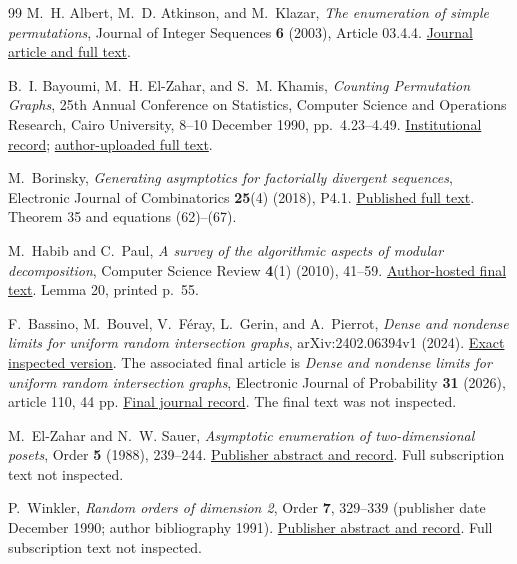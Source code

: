 \documentclass[11pt,letterpaper]{article}
\numberwithin{equation}{section}
\theoremstyle{definition}\newtheorem{definition}[theorem]{Definition}
\theoremstyle{remark}\newtheorem{remark}[theorem]{Remark}
\begin{document}
\begin{thebibliography}{99}
M.~H. Albert, M.~D. Atkinson, and M.~Klazar,
\emph{The enumeration of simple permutations},
Journal of Integer Sequences \textbf{6} (2003), Article 03.4.4.
\href{https://cs.uwaterloo.ca/journals/JIS/VOL6/Albert/albert.html}{Journal article and full text}.

B.~I. Bayoumi, M.~H. El-Zahar, and S.~M. Khamis,
\emph{Counting Permutation Graphs},
25th Annual Conference on Statistics, Computer Science and
Operations Research, Cairo University, 8--10 December 1990,
pp.~4.23--4.49.
\href{https://www.research.asu.edu.eg/handle/123456789/1142}{Institutional record};
\href{https://www.researchgate.net/profile/Soheir-M-Khamis/publication/324587746_Counting_Permutation_Graphs/links/5ad7259ba6fdcc2935835c6e/Counting-Permutation-Graphs.pdf}{author-uploaded full text}.

M.~Borinsky,
\emph{Generating asymptotics for factorially divergent sequences},
Electronic Journal of Combinatorics \textbf{25}(4) (2018), P4.1.
\href{https://www.combinatorics.org/ojs/index.php/eljc/article/download/v25i4p1/pdf/}{Published full text}.
Theorem 35 and equations (62)--(67).

M.~Habib and C.~Paul,
\emph{A survey of the algorithmic aspects of modular decomposition},
Computer Science Review \textbf{4}(1) (2010), 41--59.
\href{https://www.irif.fr/~habib/Documents/HP10.pdf}{Author-hosted final text}.
Lemma 20, printed p.~55.

F.~Bassino, M.~Bouvel, V.~F\'eray, L.~Gerin, and A.~Pierrot,
\emph{Dense and nondense limits for uniform random intersection
graphs}, arXiv:2402.06394v1 (2024).
\href{https://arxiv.org/abs/2402.06394v1}{Exact inspected version}.
The associated final article is
\emph{Dense and nondense limits for uniform random intersection
graphs}, Electronic Journal of Probability \textbf{31} (2026),
article 110, 44 pp.
\href{https://doi.org/10.1214/26-EJP1570}{Final journal record}.
The final text was not inspected.

M.~El-Zahar and N.~W. Sauer,
\emph{Asymptotic enumeration of two-dimensional posets},
Order \textbf{5} (1988), 239--244.
\href{https://doi.org/10.1007/BF00354891}{Publisher abstract and record}.
Full subscription text not inspected.

P.~Winkler,
\emph{Random orders of dimension 2},
Order \textbf{7}, 329--339 (publisher date December 1990;
author bibliography 1991).
\href{https://doi.org/10.1007/BF00383197}{Publisher abstract and record}.
Full subscription text not inspected.


\end{thebibliography}
\end{document}
